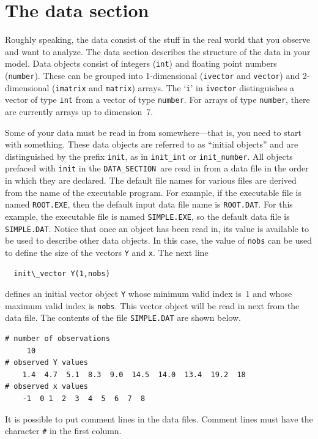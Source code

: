 \documentclass{admbmanual}
\newcommand\DS{\texttt{DATA\_SECTION}}
\begin{document}
\section{The data section}

Roughly speaking, the data consist of the stuff in the real world that you
observe and want to analyze. The data section describes the structure of the
data in your model. Data objects consist of integers (\texttt{int}) and floating
point numbers (\texttt{number}). These can be grouped into 1-dimensional
(\texttt{ivector} and \texttt{vector}) and 2-dimensional (\texttt{imatrix} and
\texttt{matrix}) arrays. The `\texttt{i}' in \texttt{ivector} distinguishes a
vector of type \texttt{int} from a vector of type \texttt{number}. For arrays of
type \texttt{number}, there are currently arrays up to dimension~7.

Some of your data must be read in from somewhere---that is, you need to start
with something. These data objects are referred to as ``initial objects'' and
are distinguished by the prefix \texttt{init}, as in \texttt{init\_int} or
\texttt{init\_number}. All objects prefaced with \texttt{init} in the \DS\ are
read in from a data file in the order in which they are declared. The default
file names for various files are derived from the name of the executable
program. For example, if the executable file is named \texttt{ROOT.EXE}, then
the default input data file name is \texttt{ROOT.DAT}. For this example, the
executable file is named \texttt{SIMPLE.EXE}, so the default data file is
\texttt{SIMPLE.DAT}. Notice that once an object has been read in, its value is
available to be used to describe other data objects. In this case, the value of
\texttt{nobs} can be used to define the size of the vectors \texttt{Y} and
\texttt{x}. The next line
\begin{lstlisting}
  init\_vector Y(1,nobs)
\end{lstlisting}
defines an initial vector object \texttt{Y} whose minimum valid index is~1 and
whose maximum valid index is \texttt{nobs}. This vector object will be read in
next from the data file. The contents of the file \texttt{SIMPLE.DAT} are shown
below.
\begin{lstlisting}
# number of observations
     10
# observed Y values
    1.4  4.7  5.1  8.3  9.0  14.5  14.0  13.4  19.2  18
# observed x values
    -1  0 1  2  3  4  5  6  7  8
\end{lstlisting}
It is possible to put comment lines in the data files.
Comment lines must have the character {\tt\#} in the first column.
\end{document}
